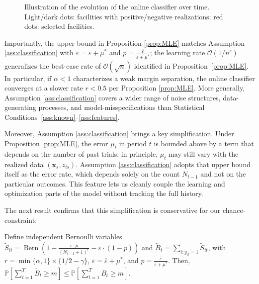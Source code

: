 \documentclass[nonblindrev]{informs3noheader}
\DeclareMathOperator{\Bern}{Bern}
\def\P{\mathbb{P}}
\def\calO{\mathcal{O}}
\def\bx{\boldsymbol{x}}
\begin{document}
\begin{figure}[h!]
{
    }
	\caption{Illustration of the evolution of the online classifier over time. Light/dark dots: facilities with positive/negative realizations; red dots: selected facilities.}
    \label{fig:error}
    \vspace{-12pt}
\end{figure}
Importantly, the upper bound in Proposition \ref{prop:MLE} matches Assumption \ref{ass:classification} with $\varepsilon = \overline\varepsilon + \mu^*$ and $p=\frac{\overline\varepsilon}{\overline\varepsilon+\mu^*}$; the learning rate $\calO(1/n^r)$ generalizes the best-case rate of $\calO(\sqrt n)$ identified in Proposition~\ref{prop:MLE}. In particular, if $\alpha<1$ characterizes a weak margin separation, the online classifier converges at a slower rate $r<0.5$ per Proposition \ref{prop:MLE}. More generally, Assumption \ref{ass:classification} covers a wider range of noise structures, data-generating processes, and model-misspecifications than Statistical Conditions~\ref{ass:known}–\ref{ass:features}.

Moreover, Assumption \ref{ass:classification} brings a key simplification. Under Proposition \ref{prop:MLE}, the error $\mu_t$ in period $t$ is bounded above by a term that depends on the number of past trials; in principle, $\mu_t$ may still vary with the realized data $(\bx_s,z_{is})$. Assumption \ref{ass:classification} adopts that upper bound itself as the error rate, which depends solely on the count $N_{t-1}$ and not on the particular outcomes. This feature lets us cleanly couple the learning and optimization parts of the model without tracking the full history.

The next result confirms that this simplification is conservative for our chance-constraint:
\begin{corollary} \label{cor:learning}
    Define independent Bernoulli variables $\widetilde{S}_{it}=\Bern\left(1-\frac{\varepsilon\cdot p}{\left(N_{t-1} + 1\right)^r}-\varepsilon\cdot(1-p)\right)$ and $\widetilde{B}_t = \sum_{i:y_{it}=1} \widetilde{S}_{it}$, with $r=\min\{\alpha,1\} \times \{1/2-\gamma\}$, $\varepsilon = \overline\varepsilon + \mu^*$, and $p = \frac{\overline\varepsilon}{\overline\varepsilon+\mu^*}$. Then, $\P\left[\sum_{t=1}^T\widetilde{B}_t\geq m\right] \leq \P\left[\sum_{t=1}^TB_t\geq m\right]$.
\end{corollary}
\end{document}
